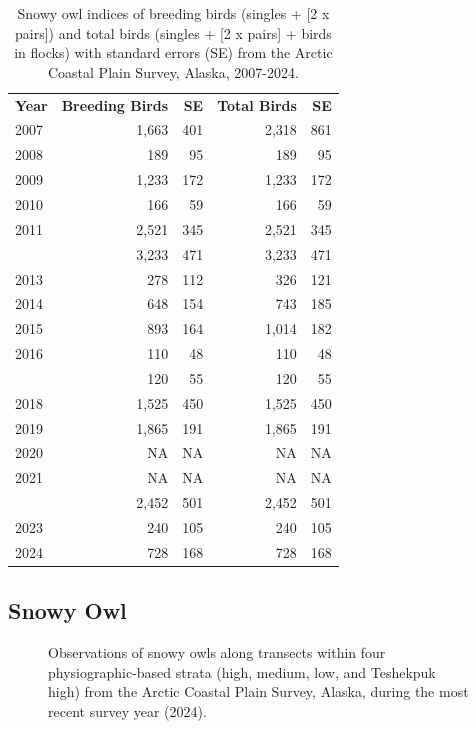 \documentclass[
]{article}
\begin{document}
\begin{longtable}[t]{lrrrr}

\caption{\label{tbl-SNOW}Snowy owl indices of breeding birds (singles +
{[}2 x pairs{]}) and total birds (singles + {[}2 x pairs{]} + birds in
flocks) with standard errors (SE) from the Arctic Coastal Plain Survey,
Alaska, 2007-2024.}

\tabularnewline

\\
\toprule
\textbf{Year} & \textbf{Breeding Birds} & \textbf{SE} & \textbf{Total Birds} & \textbf{SE}\\
\midrule
2007 & 1,663 & 401 & 2,318 & 861\\
2008 & 189 & 95 & 189 & 95\\
2009 & 1,233 & 172 & 1,233 & 172\\
2010 & 166 & 59 & 166 & 59\\
2011 & 2,521 & 345 & 2,521 & 345\\
\addlinespace
2012 & 3,233 & 471 & 3,233 & 471\\
2013 & 278 & 112 & 326 & 121\\
2014 & 648 & 154 & 743 & 185\\
2015 & 893 & 164 & 1,014 & 182\\
2016 & 110 & 48 & 110 & 48\\
\addlinespace
2017 & 120 & 55 & 120 & 55\\
2018 & 1,525 & 450 & 1,525 & 450\\
2019 & 1,865 & 191 & 1,865 & 191\\
2020 & NA & NA & NA & NA\\
2021 & NA & NA & NA & NA\\
\addlinespace
2022 & 2,452 & 501 & 2,452 & 501\\
2023 & 240 & 105 & 240 & 105\\
2024 & 728 & 168 & 728 & 168\\
\bottomrule

\end{longtable}

\endgroup{}

\newpage{}

\subsection*{Snowy Owl}\label{snowy-owl-2}

\begin{figure}


\caption{\label{fig-SNOWmap}Observations of snowy owls along transects
within four physiographic-based strata (high, medium, low, and Teshekpuk
high) from the Arctic Coastal Plain Survey, Alaska, during the most
recent survey year (2024).}

\end{figure}%
\end{document}
